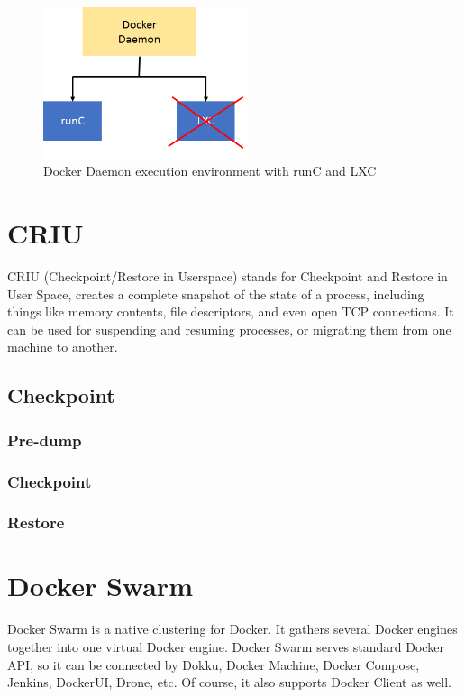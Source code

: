\begin{figure}[h]
\begin{center}
\includegraphics[width=6cm]{figure/docker_LXC.png}
\end{center}
\caption{Docker Daemon execution environment with runC and LXC}
\label{fig:docker_LXC}
\end{figure}

\section{CRIU}
CRIU \cite{CRIU} (Checkpoint/Restore in Userspace) stands for Checkpoint and Restore in User Space, creates a complete snapshot of the state of a process, including things like memory contents, file descriptors, and even open TCP connections. It can be used for suspending and resuming processes, or migrating them from one machine to another.

\subsection{Checkpoint}
\subsubsection{Pre-dump}
\subsubsection{Checkpoint}

\subsubsection{Restore}

\section{Docker Swarm}
Docker Swarm \cite{DockerSwarm} is a native clustering for Docker. It gathers several Docker engines together into one virtual Docker engine. Docker Swarm serves standard Docker API, so it can be connected by Dokku, Docker Machine, Docker Compose, Jenkins, DockerUI, Drone, etc. Of course, it also supports Docker Client as well.


